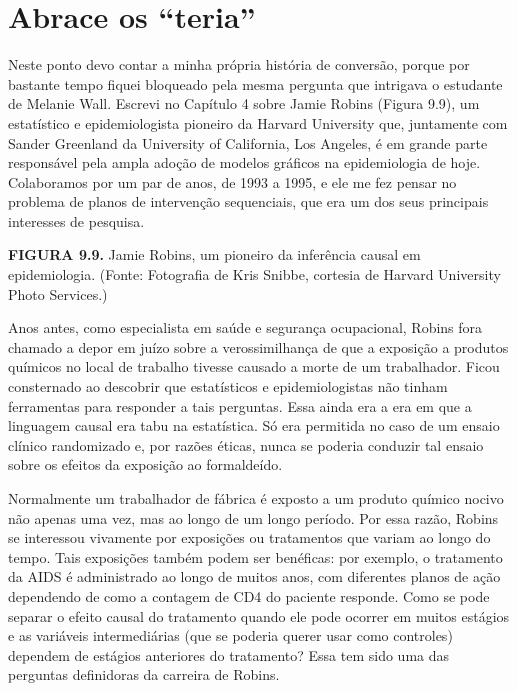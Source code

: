 \documentclass[11pt,a5paper,twoside]{book}
\begin{document}
\section{Abrace os “teria”}
Neste ponto devo contar a minha própria história de conversão, porque por bastante tempo fiquei bloqueado pela mesma pergunta que intrigava o estudante de Melanie Wall. Escrevi no Capítulo 4 sobre Jamie Robins (Figura 9.9), um estatístico e epidemiologista pioneiro da Harvard University que, juntamente com Sander Greenland da University of California, Los Angeles, é em grande parte responsável pela ampla adoção de modelos gráficos na epidemiologia de hoje. Colaboramos por um par de anos, de 1993 a 1995, e ele me fez pensar no problema de planos de intervenção sequenciais, que era um dos seus principais interesses de pesquisa.

\textbf{FIGURA 9.9.} Jamie Robins, um pioneiro da inferência causal em epidemiologia. (Fonte: Fotografia de Kris Snibbe, cortesia de Harvard University Photo Services.)

Anos antes, como especialista em saúde e segurança ocupacional, Robins fora chamado a depor em juízo sobre a verossimilhança de que a exposição a produtos químicos no local de trabalho tivesse causado a morte de um trabalhador. Ficou consternado ao descobrir que estatísticos e epidemiologistas não tinham ferramentas para responder a tais perguntas. Essa ainda era a era em que a linguagem causal era tabu na estatística. Só era permitida no caso de um ensaio clínico randomizado e, por razões éticas, nunca se poderia conduzir tal ensaio sobre os efeitos da exposição ao formaldeído.

Normalmente um trabalhador de fábrica é exposto a um produto químico nocivo não apenas uma vez, mas ao longo de um longo período. Por essa razão, Robins se interessou vivamente por exposições ou tratamentos que variam ao longo do tempo. Tais exposições também podem ser benéficas: por exemplo, o tratamento da AIDS é administrado ao longo de muitos anos, com diferentes planos de ação dependendo de como a contagem de CD4 do paciente responde. Como se pode separar o efeito causal do tratamento quando ele pode ocorrer em muitos estágios e as variáveis intermediárias (que se poderia querer usar como controles) dependem de estágios anteriores do tratamento? Essa tem sido uma das perguntas definidoras da carreira de Robins.
\end{document}
